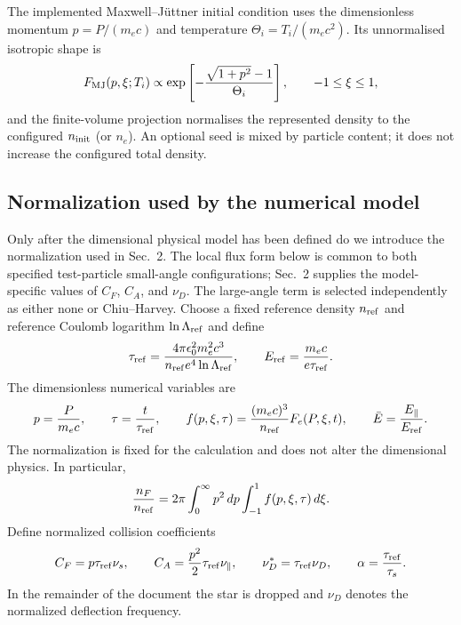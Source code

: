 \documentclass[11pt]{article}
\begin{document}
The implemented Maxwell--J{\"u}ttner initial condition uses the dimensionless momentum
$p=P/(m_ec)$ and temperature $\Theta_i=T_i/(m_ec^2)$.  Its unnormalised isotropic shape is
\begin{equation}
 F_{\rm MJ}(p,\xi;T_i)\propto
 \exp\left[-\frac{\sqrt{1+p^2}-1}{\Theta_i}\right],
 \qquad -1\leq\xi\leq1,
 \label{eq:maxwell_juttner_initial}
\end{equation}
and the finite-volume projection normalises the represented density to the configured
$n_{\rm init}$ (or $n_e$).  An optional seed is mixed by particle content; it does not
increase the configured total density.

\subsection{Normalization used by the numerical model}
\label{sec:normalization}

Only after the dimensional physical model has been defined do we introduce the
normalization used in Sec.~2.  The local flux form below is common to both specified
test-particle small-angle configurations; Sec.~2 supplies the model-specific values of
$C_F$, $C_A$, and $\nu_D$.  The large-angle term is selected independently as either none or Chiu--Harvey.  Choose a fixed reference density $n_{\rm ref}$
and reference Coulomb logarithm $\ln\Lambda_{\rm ref}$ and define
\begin{equation}
 \tau_{\rm ref}
 =\frac{4\pi\epsilon_0^2m_e^2c^3}
 {n_{\rm ref}e^4\ln\Lambda_{\rm ref}},
 \qquad
 E_{\rm ref}=\frac{m_ec}{e\tau_{\rm ref}}.
 \label{eq:reference_scales}
\end{equation}
The dimensionless numerical variables are
\begin{equation}
 p=\frac{P}{m_ec},
 \qquad
 \tau=\frac{t}{\tau_{\rm ref}},
 \qquad
 f(p,\xi,\tau)=\frac{(m_ec)^3}{n_{\rm ref}}F_e(P,\xi,t),
 \qquad
 \bar E=\frac{E_\parallel}{E_{\rm ref}}.
 \label{eq:numerical_normalization}
\end{equation}
The normalization is fixed for the calculation and does not alter the dimensional
physics.  In particular,
\begin{equation}
 \frac{n_F}{n_{\rm ref}}
 =2\pi\int_0^\infty p^2\,dp\int_{-1}^{1}f(p,\xi,\tau)\,d\xi.
 \label{eq:normalized_density}
\end{equation}
Define normalized collision coefficients
\begin{equation}
 C_F=p\tau_{\rm ref}\nu_s,
 \qquad
 C_A=\frac{p^2}{2}\tau_{\rm ref}\nu_\parallel,
 \qquad
 \nu_D^{\ast}=\tau_{\rm ref}\nu_D,
 \qquad
 \alpha=\frac{\tau_{\rm ref}}{\tau_s}.
 \label{eq:normalized_coefficients}
\end{equation}
In the remainder of the document the star is dropped and $\nu_D$ denotes the
normalized deflection frequency.
\end{document}

